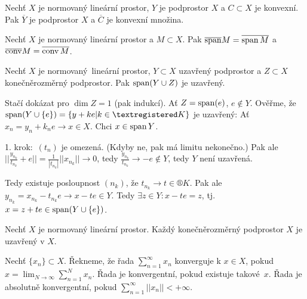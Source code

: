 \documentclass[12pt]{article}					%
\begin{document}
\begin{poznamka}[Fakt]
	Nechť $X$ je normovaný lineární prostor, $Y$ je podprostor $X$ a $C \subset X$ je konvexní. Pak $\overline{Y}$ je podprostor $X$ a $\overline{C}$ je konvexní množina.
\end{poznamka}

\begin{poznamka}[Fakt]
	Nechť $X$ je normovaný lineární prostor a $M \subset X$. Pak $\overline{\operatorname{span}} M = \overline{\operatorname{span} M}$ a $\overline{\operatorname{conv}} M = \overline{\operatorname{conv} M}$.
\end{poznamka}

\begin{veta}
	Nechť $X$ je normovaný lineární prostor, $Y \subset X$ uzavřený podprostor a $Z \subset X$ konečněrozměrný podprostor. Pak $\operatorname{span}(Y \cup Z)$ je uzavřený.

	\begin{dukazin}
		Stačí dokázat pro $\dim Z = 1$ (pak indukcí). Ať $Z = \operatorname{span}(e)$, $e \notin Y$. Ověřme, že $\spn(Y \cup \{e\}) = \{y + ke | k \in ®K\}$ je uzavřený: Ať $x_n = y_n + k_n e \rightarrow x \in X$. Chci $x \in \operatorname{span} Y$.

		1. krok: $(t_n)$ je omezená. (Kdyby ne, pak má limitu nekonečno.) Pak ale $||\frac{y_{n_k}}{t_{n_k}} + e || = \frac{1}{|t_{n_k}|} ||x_{n_k}|| \rightarrow 0$, tedy $\frac{y_{n_k}}{t_{n_k}} \rightarrow -e \notin Y$, tedy $Y$ není uzavřená. \lightning

		Tedy existuje posloupnost $(n_k)$, že $t_{n_k} \rightarrow t \in ®K$. Pak ale $y_{n_k} = x_{n_k} - t_{n_k}e \rightarrow x - t e \in Y$. Tedy $\exists z \in Y: x - t e = z$, tj. $x = z + t e \in \operatorname{span}(Y \cup \{e\})$.
	\end{dukazin}
\end{veta}

\begin{dusledek}
	Nechť $X$ je normovaný lineární prostor. Každý konečněrozměrný podprostor $X$ je uzavřený v $X$.
\end{dusledek}


\begin{definice}
	Nechť $\{x_n\} \subset X$. Řekneme, že řada $\sum_{n=1}^∞ x_n$ konverguje k $x \in X$, pokud $x = {\displaystyle \lim_{N \rightarrow ∞}} \sum_{n=1}^N x_n$. Řada je konvergentní, pokud existuje takové $x$. Řada je absolutně konvergentní, pokud $\sum_{n=1}^∞ ||x_n|| < +∞$.
\end{definice}
\end{document}
